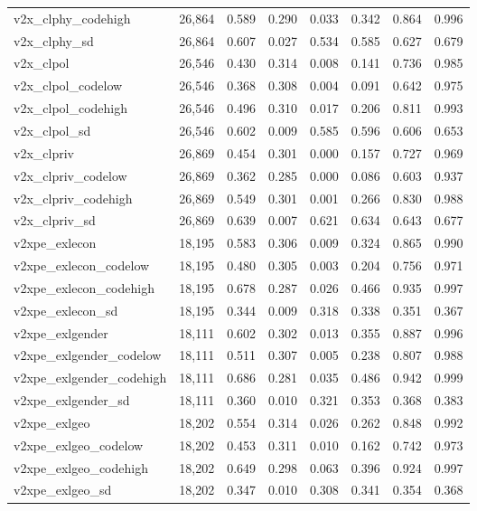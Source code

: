 \begin{table}[!htbp]
\begin{tabular}{@{\extracolsep{5pt}}lccccccc}
v2x\_clphy\_codehigh & 26,864 & 0.589 & 0.290 & 0.033 & 0.342 & 0.864 & 0.996 \\ 
v2x\_clphy\_sd & 26,864 & 0.607 & 0.027 & 0.534 & 0.585 & 0.627 & 0.679 \\ 
v2x\_clpol & 26,546 & 0.430 & 0.314 & 0.008 & 0.141 & 0.736 & 0.985 \\ 
v2x\_clpol\_codelow & 26,546 & 0.368 & 0.308 & 0.004 & 0.091 & 0.642 & 0.975 \\ 
v2x\_clpol\_codehigh & 26,546 & 0.496 & 0.310 & 0.017 & 0.206 & 0.811 & 0.993 \\ 
v2x\_clpol\_sd & 26,546 & 0.602 & 0.009 & 0.585 & 0.596 & 0.606 & 0.653 \\ 
v2x\_clpriv & 26,869 & 0.454 & 0.301 & 0.000 & 0.157 & 0.727 & 0.969 \\ 
v2x\_clpriv\_codelow & 26,869 & 0.362 & 0.285 & 0.000 & 0.086 & 0.603 & 0.937 \\ 
v2x\_clpriv\_codehigh & 26,869 & 0.549 & 0.301 & 0.001 & 0.266 & 0.830 & 0.988 \\ 
v2x\_clpriv\_sd & 26,869 & 0.639 & 0.007 & 0.621 & 0.634 & 0.643 & 0.677 \\ 
v2xpe\_exlecon & 18,195 & 0.583 & 0.306 & 0.009 & 0.324 & 0.865 & 0.990 \\ 
v2xpe\_exlecon\_codelow & 18,195 & 0.480 & 0.305 & 0.003 & 0.204 & 0.756 & 0.971 \\ 
v2xpe\_exlecon\_codehigh & 18,195 & 0.678 & 0.287 & 0.026 & 0.466 & 0.935 & 0.997 \\ 
v2xpe\_exlecon\_sd & 18,195 & 0.344 & 0.009 & 0.318 & 0.338 & 0.351 & 0.367 \\ 
v2xpe\_exlgender & 18,111 & 0.602 & 0.302 & 0.013 & 0.355 & 0.887 & 0.996 \\ 
v2xpe\_exlgender\_codelow & 18,111 & 0.511 & 0.307 & 0.005 & 0.238 & 0.807 & 0.988 \\ 
v2xpe\_exlgender\_codehigh & 18,111 & 0.686 & 0.281 & 0.035 & 0.486 & 0.942 & 0.999 \\ 
v2xpe\_exlgender\_sd & 18,111 & 0.360 & 0.010 & 0.321 & 0.353 & 0.368 & 0.383 \\ 
v2xpe\_exlgeo & 18,202 & 0.554 & 0.314 & 0.026 & 0.262 & 0.848 & 0.992 \\ 
v2xpe\_exlgeo\_codelow & 18,202 & 0.453 & 0.311 & 0.010 & 0.162 & 0.742 & 0.973 \\ 
v2xpe\_exlgeo\_codehigh & 18,202 & 0.649 & 0.298 & 0.063 & 0.396 & 0.924 & 0.997 \\ 
v2xpe\_exlgeo\_sd & 18,202 & 0.347 & 0.010 & 0.308 & 0.341 & 0.354 & 0.368 \\ 

\end{tabular}
\end{table}
